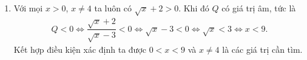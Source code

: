 \begin{bt}
{\begin{enumerate}
			\allowdisplaybreaks
			\begin{eqnarray*}
				\dfrac{\sqrt{x}+2}{\sqrt{x}-3}=2 \Leftrightarrow \sqrt{x}+2=2\sqrt{x}-6 \Leftrightarrow \sqrt{x}=8 \Leftrightarrow x=64.
			\end{eqnarray*}
			Kết hợp điều kiện xác định ta được $x=64$ là giá trị thỏa mãn yêu cầu bài toán.
			\item Với mọi $x>0$, $x \neq 4$ ta luôn có $\sqrt{x}+2>0$. Khi đó $Q$ có giá trị âm, tức là
			\allowdisplaybreaks
			\begin{eqnarray*}
				Q < 0 \Leftrightarrow \dfrac{\sqrt{x}+2}{\sqrt{x}-3} < 0 \Leftrightarrow \sqrt{x}-3 <0 \Leftrightarrow \sqrt{x} < 3 \Leftrightarrow x<9.
			\end{eqnarray*}
			Kết hợp điều kiện xác định ta được $0<x<9$ và $x \neq 4$ là các giá trị cần tìm.
		\end{enumerate}
	}
\end{bt}

